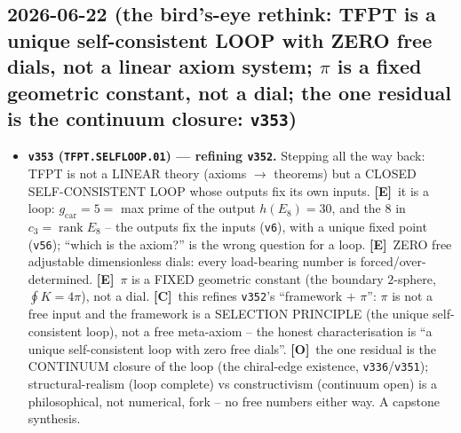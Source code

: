 \documentclass[11pt]{article}
\providecommand{\mE}{\textbf{[E]}}\providecommand{\mC}{\textbf{[C]}}
\providecommand{\mO}{\textbf{[O]}}\providecommand{\mX}{\textbf{[X]}}
\providecommand{\vref}[1]{\texttt{#1}}
\providecommand{\cthree}{c_3}\providecommand{\phiz}{\varphi_0^{\mathrm{ret}}}
\providecommand{\gcar}{g_{\mathrm{car}}}\providecommand{\Nfam}{N_{\mathrm{fam}}}
\begin{document}
\subsection*{2026-06-22 (the bird's-eye rethink: TFPT is a unique self-consistent LOOP with ZERO free dials, not a linear axiom system; $\pi$ is a fixed geometric constant, not a dial; the one residual is the continuum closure: \texttt{v353})}
\begin{itemize}
\item \textbf{\texttt{v353} (\texttt{TFPT.SELFLOOP.01}) --- refining \vref{v352}.} Stepping all the way back: TFPT is
not a LINEAR theory (axioms $\to$ theorems) but a CLOSED SELF-CONSISTENT LOOP whose outputs fix its own inputs.
\mE\ it is a loop: $\gcar{=}5{=}$ max prime of the output $h(E_8){=}30$, and the $8$ in $\cthree{=}\operatorname{rank}
E_8$ -- the outputs fix the inputs (\vref{v6}), with a unique fixed point (\vref{v56}); ``which is the axiom?'' is
the wrong question for a loop. \mE\ ZERO free adjustable dimensionless dials: every load-bearing number is
forced/over-determined. \mE\ $\pi$ is a FIXED geometric constant (the boundary $2$-sphere, $\oint K{=}4\pi$), not a
dial. \mC\ this refines \vref{v352}'s ``framework $+$ $\pi$'': $\pi$ is not a free input and the framework is a
SELECTION PRINCIPLE (the unique self-consistent loop), not a free meta-axiom -- the honest characterisation is ``a
unique self-consistent loop with zero free dials''. \mO\ the one residual is the CONTINUUM closure of the loop (the
chiral-edge existence, \vref{v336}/\vref{v351}); structural-realism (loop complete) vs constructivism (continuum
open) is a philosophical, not numerical, fork -- no free numbers either way. A capstone synthesis.
\end{itemize}
\end{document}
